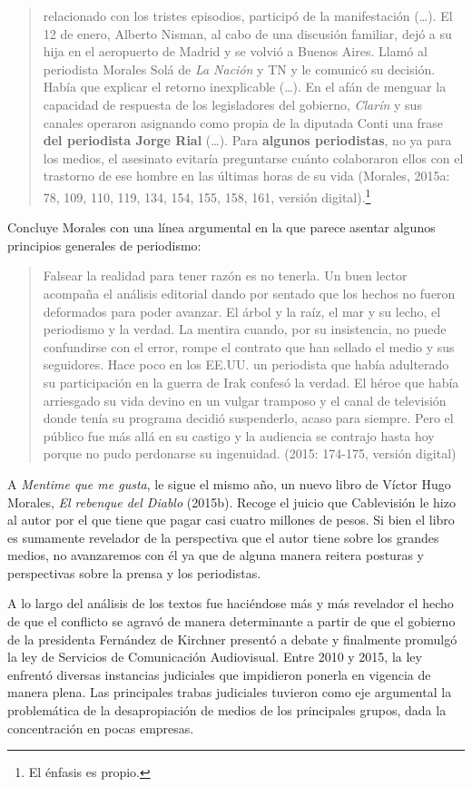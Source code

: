 {\begin{quote}
relacionado con los tristes episodios, participó de la manifestación (\ldots). El 12 de enero, Alberto Nisman, al cabo de una discusión familiar, dejó a su hija en el aeropuerto de Madrid y se volvió a Buenos Aires. Llamó al periodista Morales Solá de \emph{La Nación} y TN y le comunicó su decisión. Había que explicar el retorno inexplicable (\ldots). En el afán de menguar la capacidad de respuesta de los legisladores del gobierno, \emph{Clarín} y sus canales operaron asignando como propia de la diputada Conti una frase \textbf{del periodista Jorge Rial} (\ldots). Para \textbf{algunos periodistas}, no ya para los medios, el asesinato evitaría preguntarse cuánto colaboraron ellos con el trastorno de ese hombre en las últimas horas de su vida (Morales, 2015a: 78, 109, 110, 119, 134, 154, 155, 158, 161, versión digital).\footnote{El énfasis es propio.}
\end{quote}

Concluye Morales con una línea argumental en la que parece asentar algunos principios generales de periodismo:

\begin{quote}
Falsear la realidad para tener razón es no tenerla. Un buen lector acompaña el análisis editorial dando por sentado que los hechos no fueron deformados para poder avanzar. El árbol y la raíz, el mar y su lecho, el periodismo y la verdad. La mentira cuando, por su insistencia, no puede confundirse con el error, rompe el contrato que han sellado el medio y sus seguidores. Hace poco en los EE.UU. un periodista que había adulterado su participación en la guerra de Irak confesó la verdad. El héroe que había arriesgado su vida devino en un vulgar tramposo y el canal de televisión donde tenía su programa decidió suspenderlo, acaso para siempre. Pero el público fue más allá en su castigo y la audiencia se contrajo hasta hoy porque no pudo perdonarse su ingenuidad. (2015: 174-175, versión digital)
\end{quote}

A \emph{Mentime que me gusta}, le sigue el mismo año, un nuevo libro de Víctor Hugo Morales, \emph{El rebenque del Diablo} (2015b). Recoge el juicio que Cablevisión le hizo al autor por el que tiene que pagar casi cuatro millones de pesos. Si bien el libro es sumamente revelador de la perspectiva que el autor tiene sobre los grandes medios, no avanzaremos con él ya que de alguna manera reitera posturas y perspectivas sobre la prensa y los periodistas.

A lo largo del análisis de los textos fue haciéndose más y más revelador el hecho de que el conflicto se agravó de manera determinante a partir de que el gobierno de la presidenta Fernández de Kirchner presentó a debate y finalmente promulgó la ley de Servicios de Comunicación Audiovisual. Entre 2010 y 2015, la ley enfrentó diversas instancias judiciales que impidieron ponerla en vigencia de manera plena. Las principales trabas judiciales tuvieron como eje argumental la problemática de la desapropiación de medios de los principales grupos, dada la concentración en pocas empresas.

}
